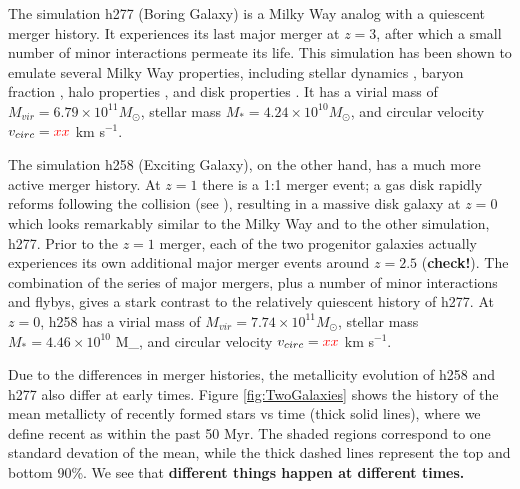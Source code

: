 \documentclass[nofootinbib,twocolumn,prd]{emulateapj}
\newcommand\editremark[1]{{\color{red}#1}}
\newcommand\msun{M_\odot}
\begin{document}
The simulation h277 (Boring Galaxy) is a Milky Way analog with a
quiescent merger history.  It experiences its last major merger at $z
= 3$, after which a small number of minor interactions permeate its
life.  This simulation has been shown to emulate several Milky Way
properties, including stellar dynamics
\citep{Loebman12,Loebman14,Kassin14}, baryon fraction
\citep{Munshi13}, halo properties \citep{Zolotov09,Zolotov10}, and
  disk properties \citep{Brooks11}.  It has a virial mass of $M_{vir}
  = 6.79 \times 10^{11}  \msun$, stellar mass $M_* = 4.24 \times
  10^{10} \msun$, and circular velocity $v_{circ} = \editremark{xx}$ km s$^{-1}$.

  The simulation h258 (Exciting Galaxy), on the other hand, has a much
  more active merger history.  At $z = 1$ there is a 1:1 merger event;
  a gas disk rapidly reforms following the collision (see
  \citet{Governato09}), resulting in a massive disk galaxy at $z = 0$
  which looks remarkably similar to the Milky Way and to the other
  simulation, h277.  Prior to the $z = 1$ merger, each of the two
  progenitor galaxies actually experiences its own additional major
  merger events around $z = 2.5$ ({\bf check!}).  The combination of
  the series of major mergers, plus a number of minor interactions and
  flybys, gives a stark contrast to the relatively quiescent history
  of h277.  At $z = 0$, h258 has a virial mass of $M_{vir} = 7.74
  \times 10^{11} \msun$, stellar mass $M_* = 4.46 \times 10^{10}$
  \msun, and circular velocity $v_{circ} = \editremark{xx}$ km s$^{-1}$.


  Due to the differences in merger histories, the metallicity
  evolution of h258 and h277 also differ at early times.  Figure
  \ref{fig:TwoGalaxies} shows the history of the mean metallicty of
  recently formed stars vs time (thick solid lines), where we define
  recent as within the past 50 Myr.  The shaded regions correspond to
  one standard devation of the mean, while the thick dashed lines
  represent the top and bottom 90\%.  We see that {\bf different things happen at different times.}
\end{document}
